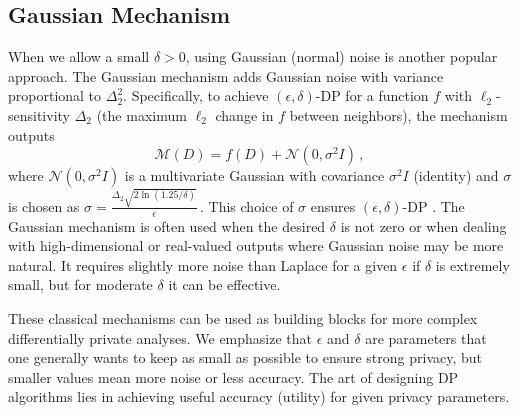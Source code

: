 \documentclass[11pt, a4paper]{article}
\begin{document}
\subsection{Gaussian Mechanism}
When we allow a small $\delta > 0$, using Gaussian (normal) noise is another popular approach.
The Gaussian mechanism adds Gaussian noise with variance proportional to $\Delta_2^2$.
Specifically, to achieve $(\epsilon,\delta)$-DP for a function $f$
with $\ell_2$-sensitivity $\Delta_2$ (the maximum $\ell_2$ change in $f$ between neighbors),
the mechanism outputs
\[ \mathcal{M}(D) = f(D) + \mathcal{N}(0, \sigma^2 I)\,, \] 
where $\mathcal{N}(0, \sigma^2 I)$ is a multivariate Gaussian with covariance $\sigma^2 I$ (identity) 
and $\sigma$ is chosen as $\sigma = \frac{\Delta_2 \sqrt{2\ln(1.25/\delta)}}{\epsilon}\,. $
This choice of $\sigma$ ensures $(\epsilon,\delta)$-DP \cite{DworkRoth2014}.
The Gaussian mechanism is often used when the desired $\delta$ is not zero 
or when dealing with high-dimensional or real-valued outputs where Gaussian noise may be more natural.
It requires slightly more noise than Laplace for a given $\epsilon$ 
if $\delta$ is extremely small, but for moderate $\delta$ it can be effective.

These classical mechanisms can be used as building blocks for more complex differentially private analyses.
We emphasize that $\epsilon$ and $\delta$ are parameters that one generally wants to keep as small as possible 
to ensure strong privacy, but smaller values mean more noise or less accuracy.
The art of designing DP algorithms lies in achieving useful accuracy (utility) for given privacy parameters.
\end{document}
